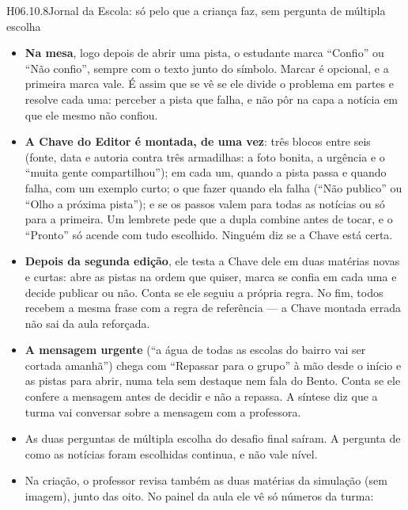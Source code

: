 \begin{historia}{H06.10.8}{Jornal da Escola: só pelo que a criança faz, sem pergunta de múltipla escolha}{\parcial}
\aceite
\begin{itemize}
  \item \textbf{Na mesa}, logo depois de abrir uma pista, o estudante marca
    \enquote{Confio} ou \enquote{Não confio}, sempre com o texto junto do
    símbolo. Marcar é opcional, e a primeira marca vale. É assim que se vê se
    ele divide o problema em partes e resolve cada uma: perceber a pista que
    falha, e não pôr na capa a notícia em que ele mesmo não confiou.
  \item \textbf{A Chave do Editor é montada, de uma vez}: três blocos entre
    seis (fonte, data e autoria contra três armadilhas: a foto bonita, a
    urgência e o \enquote{muita gente compartilhou}); em cada um, quando a pista
    passa e quando falha, com um exemplo curto; o que fazer quando ela falha
    (\enquote{Não publico} ou \enquote{Olho a próxima pista}); e se os passos
    valem para todas as notícias ou só para a primeira. Um lembrete pede que a
    dupla combine antes de tocar, e o \enquote{Pronto} só acende com tudo
    escolhido. Ninguém diz se a Chave está certa.
  \item \textbf{Depois da segunda edição}, ele testa a Chave dele em duas
    matérias novas e curtas: abre as pistas na ordem que quiser, marca se
    confia em cada uma e decide publicar ou não. Conta se ele seguiu a própria
    regra. No fim, todos recebem a mesma frase com a regra de referência --- a
    Chave montada errada não sai da aula reforçada.
  \item \textbf{A mensagem urgente} (\enquote{a água de todas as escolas do
    bairro vai ser cortada amanhã}) chega com \enquote{Repassar para o grupo}
    à mão desde o início e as pistas para abrir, numa tela sem destaque nem fala
    do Bento. Conta se ele confere a mensagem antes de decidir e não a repassa.
    A síntese diz que a turma vai conversar sobre a mensagem com a professora.
  \item As duas perguntas de múltipla escolha do desafio final saíram. A
    pergunta de como as notícias foram escolhidas continua, e não vale nível.
  \item Na criação, o professor revisa também as duas matérias da simulação
    (sem imagem), junto das oito. No painel da aula ele vê só números da turma:

\end{itemize}
\end{historia}

